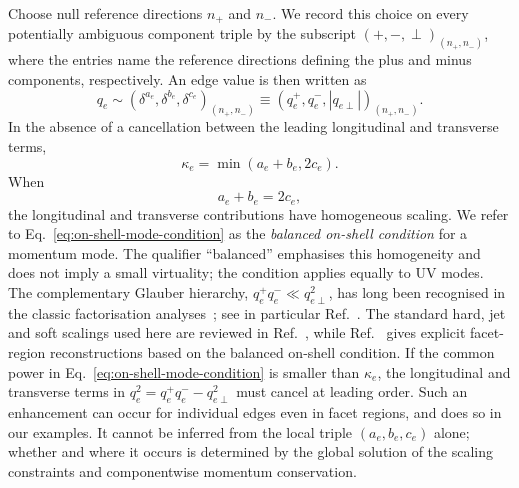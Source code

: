 \documentclass[a4paper,11pt]{article}
\begin{document}
Choose null reference directions \(n_+\) and \(n_-\).  We record this choice
on every potentially ambiguous component triple by the subscript
\((+,-,\perp)_{(n_+,n_-)}\), where the entries name the reference directions
defining the plus and minus components, respectively.  An edge value is then
written as
\begin{equation}
 q_e\sim(\delta^{a_e},\delta^{b_e},\delta^{c_e})_{(n_+,n_-)}
 \equiv(q_e^+,q_e^-,|q_{e\perp}|)_{(n_+,n_-)}.
 \label{eq:edge-component-powers}
\end{equation}
In the absence of a cancellation between the leading longitudinal and
transverse terms,
\begin{equation}
 \kappa_e=\min(a_e+b_e,2c_e).
 \label{eq:direct-virtuality-rule}
\end{equation}
When
\begin{equation}
 a_e+b_e=2c_e,
 \label{eq:on-shell-mode-condition}
\end{equation}
the longitudinal and transverse contributions have homogeneous scaling.  We
refer to Eq.~\eqref{eq:on-shell-mode-condition} as the \emph{balanced on-shell
condition} for a momentum mode.  The qualifier ``balanced'' emphasises this
homogeneity and does not imply a small virtuality; the condition applies
equally to UV modes.  The complementary Glauber hierarchy,
\(q_e^+q_e^-\ll q_{e\perp}^2\), has long been recognised in the classic
factorisation analyses~\cite{Collins:1984kg,Collins:1985ue}; see in particular
Ref.~\cite[Sec.~8.4, especially Eq.~(137)]{Collins:1989gx}.  The standard hard,
jet and soft scalings used here are reviewed in
Ref.~\cite[Sec.~2.3, especially Eqs.~(2.42)--(2.45)]{Gardi:2022khw}, while
Ref.~\cite[Sec.~4, especially Eqs.~(4.15)--(4.17)]{Gardi:2025ule} gives explicit
facet-region reconstructions based on the balanced on-shell condition.
If the common power in Eq.~\eqref{eq:on-shell-mode-condition} is smaller than
\(\kappa_e\), the longitudinal and transverse terms in
\(q_e^2=q_e^+q_e^- -q_{e\perp}^2\) must cancel at leading order.  Such an
enhancement can occur for individual edges even in facet regions, and does so
in our examples.  It cannot be inferred from the local triple
\((a_e,b_e,c_e)\) alone; whether and where it occurs is determined by the
global solution of the scaling constraints and componentwise momentum
conservation.
\end{document}
